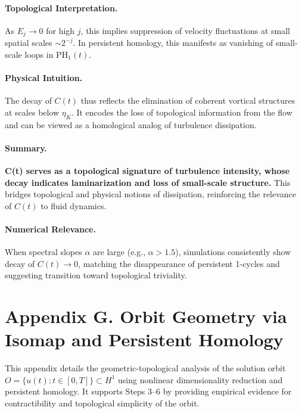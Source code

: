 \documentclass[11pt]{article}
\theoremstyle{definition}
\begin{document}
\paragraph{Topological Interpretation.} As \( E_j \to 0 \) for high \( j \), this implies suppression of velocity fluctuations at small spatial scales \( \sim 2^{-j} \). In persistent homology, this manifests as vanishing of small-scale loops in \( \mathrm{PH}_1(t) \).

\paragraph{Physical Intuition.} The decay of \( C(t) \) thus reflects the elimination of coherent vortical structures at scales below \( \eta_K \). It encodes the loss of topological information from the flow and can be viewed as a homological analog of turbulence dissipation.

\paragraph{Summary.} \textbf{C(t) serves as a topological signature of turbulence intensity, whose decay indicates laminarization and loss of small-scale structure.} This bridges topological and physical notions of dissipation, reinforcing the relevance of \( C(t) \) to fluid dynamics.

\paragraph{Numerical Relevance.} When spectral slopes \( \alpha \) are large (e.g., \( \alpha > 1.5 \)), simulations consistently show decay of \( C(t) \to 0 \), matching the disappearance of persistent 1-cycles and suggesting transition toward topological triviality.


\section*{Appendix G. Orbit Geometry via Isomap and Persistent Homology}
\label{sec:appendixG}

This appendix details the geometric-topological analysis of the solution orbit \( O = \{ u(t) : t \in [0,T] \} \subset H^1 \) using nonlinear dimensionality reduction and persistent homology. It supports Steps 3--6 by providing empirical evidence for contractibility and topological simplicity of the orbit.
\end{document}
